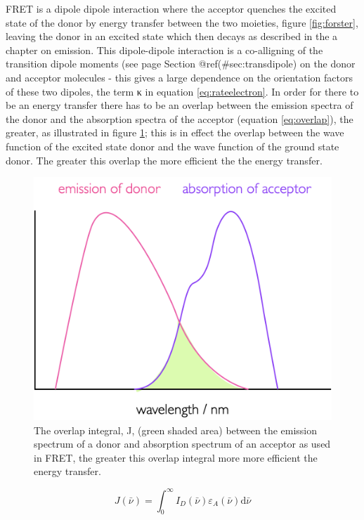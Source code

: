 \documentclass[
]{book}
\begin{document}
FRET is a dipole dipole interaction where the acceptor quenches the excited state of the donor by energy transfer between the two moieties, figure \ref{fig:forster}, leaving the donor in an excited state which then decays as described in the a chapter on emission. This dipole-dipole interaction is a co-alligning of the transition dipole moments (see page Section @ref(\#sec:transdipole) on the donor and acceptor molecules - this gives a large dependence on the orientation factors of these two dipoles, the term κ in equation \eqref{eq:rateelectron}. In order for there to be an energy transfer there has to be an overlap between the emission spectra of the donor and the absorption spectra of the acceptor (equation \eqref{eq:overlap}), the greater, as illustrated in figure \ref{fig:overlapintegral}; this is in effect the overlap between the wave function of the excited state donor and the wave function of the ground state donor. The greater this overlap the more efficient the the energy transfer.

\begin{figure}

{\centering \includegraphics[width=0.7\linewidth]{images/overlapintegral} 

}

\caption{The overlap integral, J, (green shaded area) between the emission spectrum of a donor and absorption spectrum of an acceptor as used in FRET, the greater this overlap integral more more efficient the energy transfer.}\label{fig:overlapintegral}
\end{figure}

\begin{equation}
J (\bar \nu) = \int_0^\infty I_D(\bar \nu)\varepsilon_A(\bar \nu)\textrm{d}\bar \nu
\label{eq:overlap}
\end{equation}
\end{document}
